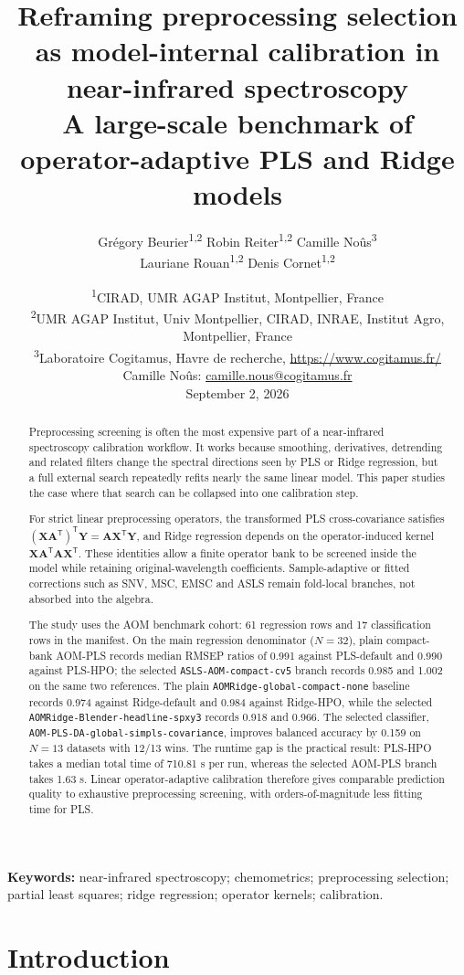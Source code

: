 \documentclass[11pt,a4paper]{article}
\title{\textbf{Reframing preprocessing selection as model-internal calibration in near-infrared spectroscopy}\\
\large A large-scale benchmark of operator-adaptive PLS and Ridge models}
\author{
Gr{\'e}gory Beurier\textsuperscript{1,2}
\quad Robin Reiter\textsuperscript{1,2}
\quad Camille No{\^u}s\textsuperscript{3}\\[0.35em]
Lauriane Rouan\textsuperscript{1,2}
\quad Denis Cornet\textsuperscript{1,2}
}
\date{
\textsuperscript{1}CIRAD, UMR AGAP Institut, Montpellier, France\\
\textsuperscript{2}UMR AGAP Institut, Univ Montpellier, CIRAD, INRAE, Institut Agro, Montpellier, France\\[0.75em]
\textsuperscript{3}Laboratoire Cogitamus, Havre de recherche, \url{https://www.cogitamus.fr/}\\
Camille No{\^u}s: \href{mailto:camille.nous@cogitamus.fr}{camille.nous@cogitamus.fr}\\[0.75em]
September 2, 2026
}
\newcommand{\X}{\mathbf{X}}
\newcommand{\Y}{\mathbf{Y}}
\newcommand{\A}{\mathbf{A}}
\newcommand{\transpose}{^{\mathsf T}}
\begin{document}
\maketitle

\begin{abstract}
Preprocessing screening is often the most expensive part of a near-infrared
spectroscopy calibration workflow.  It works because smoothing, derivatives,
detrending and related filters change the spectral directions seen by PLS or
Ridge regression, but a full external search repeatedly refits nearly the same
linear model.  This paper studies the case where that search can be collapsed
into one calibration step.

For strict linear preprocessing operators, the transformed PLS
cross-covariance satisfies
$(\X\A\transpose)\transpose\Y=\A\X\transpose\Y$, and Ridge regression
depends on the operator-induced kernel
$\X\A\transpose\A\X\transpose$.  These identities allow a finite operator
bank to be screened inside the model while retaining original-wavelength
coefficients.  Sample-adaptive or fitted corrections such as SNV, MSC, EMSC
and ASLS remain fold-local branches, not absorbed into the algebra.

The study uses the AOM benchmark cohort: 61 regression rows and 17
classification rows in the manifest.  On the main regression denominator ($N=32$),
plain compact-bank AOM-PLS records median RMSEP ratios of 0.991 against
PLS-default and 0.990 against PLS-HPO; the selected
\texttt{ASLS-AOM-compact-cv5} branch records 0.985 and 1.002 on the same two
references.  The plain \texttt{AOMRidge-global-compact-none} baseline records
0.974 against Ridge-default and 0.984 against Ridge-HPO, while the selected
\texttt{AOMRidge-Blender-headline-spxy3} records 0.918 and 0.966.  The
selected classifier, \texttt{AOM-PLS-DA-global-simpls-covariance}, improves
balanced accuracy by 0.159 on $N=13$ datasets with 12/13 wins.  The runtime
gap is the practical result: PLS-HPO takes a median total time of 710.81 s per
run, whereas the selected AOM-PLS branch takes 1.63 s.  Linear
operator-adaptive calibration therefore gives comparable prediction quality to
exhaustive preprocessing screening, with orders-of-magnitude less fitting
time for PLS.
\end{abstract}

\noindent\textbf{Keywords:} near-infrared spectroscopy; chemometrics;
preprocessing selection; partial least squares; ridge regression; operator
kernels; calibration.

\section{Introduction}
\end{document}
